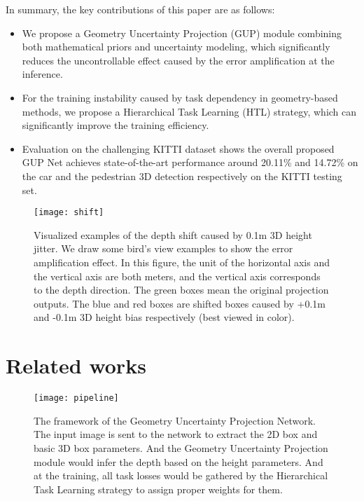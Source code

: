 \documentclass[10pt,twocolumn,letterpaper]{article}
\begin{document}
 

\iffalse 
\begin{figure}[t]
\begin{center}
\texttt{[image: geometry\_projection.pdf]}
\end{center}
   \caption{The principle of the geometry projection models.  is the focal length provided by the camera intrinsic parameters.}
\label{fig:project_pipe}
\end{figure}
\fi








In summary, the key contributions of this paper are as follows:
\begin{itemize}
\item We propose a Geometry Uncertainty Projection (GUP) module combining both mathematical priors and uncertainty modeling, which significantly reduces the uncontrollable effect caused by the error amplification at the inference. 
    \item For the training instability caused by task dependency in geometry-based methods, we propose a Hierarchical Task Learning (HTL) strategy, which can significantly improve the training efficiency.
    \item Evaluation on the challenging KITTI dataset shows the overall proposed GUP Net achieves state-of-the-art performance around 20.11\% and 14.72\% on the car and the pedestrian 3D detection respectively on the KITTI testing set.
\end{itemize}
\begin{figure}[t]
\begin{center}
\texttt{[image: shift]}
\end{center}
   \caption{Visualized examples of the depth shift caused by 0.1m 3D height jitter. We draw some bird's view examples to show the error amplification effect. In this figure, the unit of the horizontal axis and the vertical axis are both meters, and the vertical axis corresponds to the depth direction. The \textcolor[RGB]{50,205,50}{green} boxes mean the original projection outputs. The \textcolor[RGB]{0,102,153}{
  blue} and \textcolor[RGB]{178,34,34}{red} boxes are shifted boxes caused by +0.1m and -0.1m 3D height bias respectively (best viewed in color). }
\label{fig:shift}
\end{figure} 
\section{Related works}
\begin{figure*}[t]
\begin{center}
\texttt{[image: pipeline]}
\end{center}
   \caption{The framework of the Geometry Uncertainty Projection Network. The input image is sent to the network to extract the 2D box and basic 3D box parameters. And the Geometry Uncertainty Projection module would infer the depth based on the height parameters. And at the training, all task losses would be gathered by the Hierarchical Task Learning strategy to assign proper weights for them. }
\label{fig:pipeline}
\end{figure*}
\end{document}
